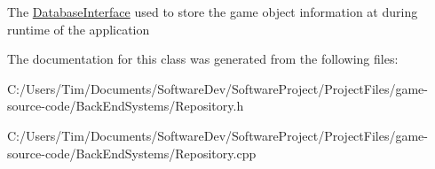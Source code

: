 The \hyperlink{class_database_interface}{Database\+Interface} used to store the game object information at during runtime of the application 

The documentation for this class was generated from the following files\+:\begin{DoxyCompactItemize}
\item 
C\+:/\+Users/\+Tim/\+Documents/\+Software\+Dev/\+Software\+Project/\+Project\+Files/game-\/source-\/code/\+Back\+End\+Systems/Repository.\+h\item 
C\+:/\+Users/\+Tim/\+Documents/\+Software\+Dev/\+Software\+Project/\+Project\+Files/game-\/source-\/code/\+Back\+End\+Systems/Repository.\+cpp\end{DoxyCompactItemize}
